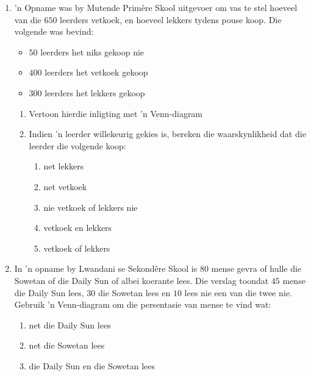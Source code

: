 \begin{eocexercises}{}
\begin{enumerate}[itemsep=5pt, label=\textbf{\arabic*}.]
  \item 'n Opname was by Mutende Primêre Skool uitgevoer om vas te stel hoeveel van die $ 650 $ leerders vetkoek, en hoeveel lekkers tydens pouse koop. Die volgende was bevind:
\begin{itemize}
 \item $50$ leerders het niks gekoop nie
\item $400$ leerders het vetkoek gekoop
\item $300$ leerders het lekkers gekoop
\end{itemize}
\begin{enumerate}[noitemsep, label=\textbf{(\alph*)} ]
 \item Vertoon hierdie inligting met 'n Venn-diagram
\item Indien 'n leerder willekeurig gekies is, bereken die waarskynlikheid dat die leerder die volgende koop:
\begin{enumerate}[noitemsep, label=\roman*. ]
 \item net lekkers
\item net vetkoek
\item nie vetkoek of lekkers nie
\item vetkoek en lekkers
\item vetkoek of lekkers
\end{enumerate}
\end{enumerate}
\item In 'n opname by Lwandani se Sekondêre Skool is $80$ mense gevra of hulle die Sowetan of die Daily Sun of albei koerante lees. Die verslag toondat $45$ mense die Daily Sun lees, $30$ die Sowetan lees en $10$ lees nie een van die twee nie. Gebruik 'n Venn-diagram om die persentasie van mense te vind wat:
\begin{enumerate}[noitemsep, label=\textbf{(\alph*)} ]
 \item net die Daily Sun lees
\item net die Sowetan lees
\item die Daily Sun en die Sowetan lees
\end{enumerate}

  \end{enumerate}
\end{eocexercises}


